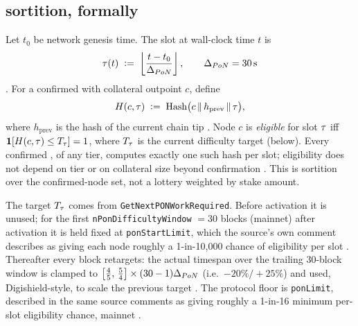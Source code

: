 \subsection{\PoN sortition, formally}
\label{sec:consensus-sortition}

\begin{definition}
\label{def:pon-eligibility}
Let $t_0$ be network genesis time. The \PoN slot at wall-clock time $t$ is
\[
\tau(t) \;\vcentcolon=\; \left\lfloor \frac{t - t_0}{\Delta_{PoN}} \right\rfloor, \qquad \Delta_{PoN} = 30\,\mathrm{s}
\]
\shipped {}. For a confirmed \FluxNode with collateral outpoint
$c$, define
\[
H(c,\tau) \;\vcentcolon=\; \mathrm{Hash}\big(c \,\|\, h_{\mathrm{prev}} \,\|\, \tau\big),
\]
where $h_{\mathrm{prev}}$ is the hash of the current chain tip
\shipped {}. Node $c$ is \emph{eligible} for slot $\tau$ iff
$\mathbf{1}\!\left[H(c,\tau) \le T_{\tau}\right] = 1$, where $T_{\tau}$ is the current \PoN difficulty target (below).
Every confirmed \FluxNode, of any tier, computes exactly one such hash per slot; eligibility does not
depend on tier or on collateral size beyond confirmation
\shipped {}. This is sortition over the confirmed-node set, not
a lottery weighted by stake amount.
\end{definition}

The target $T_{\tau}$ comes from \texttt{Get\allowbreak{}Next\allowbreak{}PONWork\allowbreak{}Required}. Before \PoN activation it is unused;
for the first \texttt{n\allowbreak{}Pon\allowbreak{}Difficulty\allowbreak{}Window} $= 30$ blocks (mainnet) after activation it is held fixed at \texttt{ponStartLimit},
which the source's own comment describes as giving each node roughly a 1-in-10{,}000 chance of
eligibility per slot \shipped {}. Thereafter every block
retargets: the actual timespan over the trailing 30-block window is clamped to
$\big[\tfrac{4}{5},\,\tfrac{5}{4}\big] \times (30-1)\Delta_{PoN}$ (i.e.\ $-20\%/{+}25\%$) and used,
Digishield-style, to scale the previous target
\shipped {}. The protocol floor is \texttt{ponLimit}, described
in the same source comments as giving roughly a 1-in-16 minimum per-slot eligibility chance, mainnet
\shipped {}.

